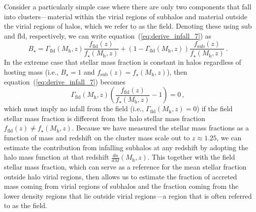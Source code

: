 \documentclass[useAMS,usenatbib,iop,numberedappendix]{mn2e}
\newcommand{\redshift}{\ensuremath{z}}
\newcommand{\Mhalo}{\ensuremath{M_{\mathrm{h}}}}
\newcommand{\Bstar}{\ensuremath{B_{\star}}}
\newcommand{\fstar}{\ensuremath{f_{\star}}}
\begin{document}
Consider a particularly simple case where there are only two components that fall into clusters---material within the virial regions of subhalos and material outside the virial regions of halos, which we refer to as the field.  Denoting these using $\mathrm{sub}$ and $\mathrm{fld}$, respectively, we can write
equation~(\ref{eq:derive_infall_7}) as
%
\begin{equation}
\label{eq:derive_infall_8}
\Bstar = 
\Gamma_{\mathrm{fld}}(\Mhalo, \redshift)  
\frac{ f_{\mathrm{fld}}(\redshift) }{  
\fstar(\Mhalo, \redshift) } + 
(1 - \Gamma_{\mathrm{fld}}(\Mhalo, \redshift) )
\frac{ f_{\mathrm{sub}}(\redshift) }{  
\fstar(\Mhalo, \redshift) }
\, .
\end{equation}
%
In the extreme case that stellar mass fraction is constant in halos regardless of hosting mass (i.e., $\Bstar = 1$ and $f_{\mathrm{sub}}(\redshift) = \fstar(\Mhalo, \redshift)$), then equation~(\ref{eq:derive_infall_7}) becomes
\[
\Gamma_{\mathrm{fld}}(\Mhalo, \redshift)
\left(
\frac{ f_{\mathrm{fld}}(\redshift) }{  
\fstar(\Mhalo, \redshift) } - 1
\right) = 0 \, ,
\]
which must imply no infall from the field (i.e., $\Gamma_{\mathrm{fld}}(\Mhalo, \redshift) = 0$) if the field stellar mass fraction is different from the halo stellar mass fraction $f_{\mathrm{fld}}(\redshift) \neq \fstar(\Mhalo, \redshift)$.
Because we have measured the stellar mass fractions as a function of mass and redshift on the cluster mass scale out to $\redshift\approx1.25$, we can estimate the contribution from infalling subhalos at any redshift by adopting the halo mass function at that redshift $\frac{dn}{dM}(\Mhalo,\redshift)$.  This together with the field stellar mass fraction, which can serve as  a reference for the mean stellar fraction outside halo virial regions, then allows us to estimate the fraction of accreted mass coming from virial regions of subhalos and the fraction coming from the lower density regions that lie outside virial regions---a region that is often referred to as the field.
\end{document}
